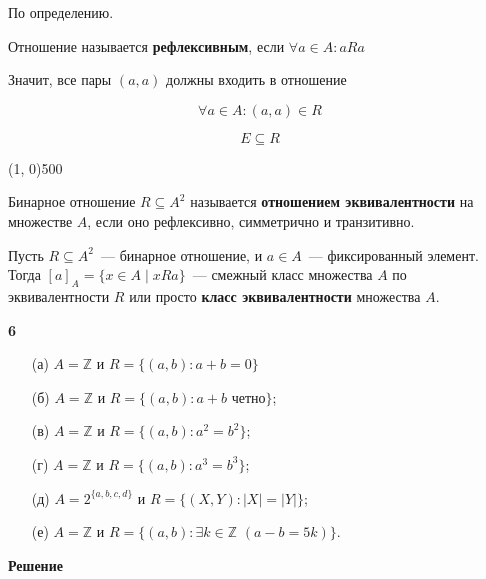 \documentclass{article}
\begin{document}
По определению.

Отношение называется \textbf{рефлексивным}, если $\forall a \in A: aRa$

Значит, все пары $(a, a)$ должны входить в отношение 

$$\forall a \in A: (a, a) \in R$$

$$E \subseteq R$$

\line(1, 0){500}

Бинарное отношение $R \subseteq A^2$ называется \textbf{отношением эквивалентности} на множестве $A$, если оно рефлексивно, симметрично и транзитивно.

Пусть $R \subseteq A^2$~--- бинарное отношение, и $a \in A$~--- фиксированный элемент. Тогда $[a]_A = \{x \in A \mid xRa \}$~--- смежный класс множества $A$ по эквивалентности $R$ или просто \textbf{класс эквивалентности} множества $A$.

\textbf{6}


\begin{itemize}
\item[(а)]
$A = \mathbb{Z}$ и $R = \{(a, b) \colon a + b = 0\}$

\item[(б)]
$A = \mathbb{Z}$ и $R = \{(a, b) \colon a + b \,\,\text{четно}\}$;

\item[(в)]
$A = \mathbb{Z}$ и $R = \{(a, b) \colon a^2 = b^2\}$;

\item[(г)]
$A = \mathbb{Z}$ и $R = \{(a, b) \colon a^3 = b^3\}$;

\item[(д)]
$A = 2^{\{a, b, c, d\}}$ и $R = \{(X, Y) \colon |X| = |Y|\}$;

\item[(е)]
$A = \mathbb{Z}$ и $R = \{(a, b) \colon \exists k \in \mathbb{Z} \,\, (a - b = 5k)\}$.
\end{itemize}
\textbf{Решение}
\end{document}
